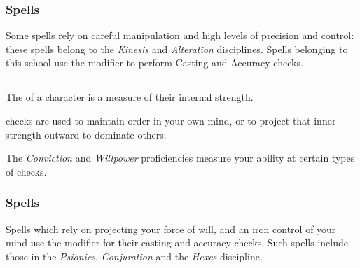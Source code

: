 \subsubsection{Spells}

Some spells rely on careful manipulation and high levels of precision and control: these spells belong to the {\it Kinesis} and {\it Alteration} disciplines. Spells belonging to this school use the \attFin{} modifier to perform Casting and Accuracy checks. 

\subsection{\attSpr{}}

The \attSpr{} of a character is a measure of their internal strength. 

\attSpr{} checks are used to maintain order in your own mind, or to project that inner strength outward to dominate others. 

The {\it Conviction} and {\it Willpower} proficiencies measure your ability at certain types of \attSpr{} checks. 



\subsubsection{Spells}

Spells which rely on projecting your force of will, and an iron control of your mind use the \attSpr{} modifier for their casting and accuracy checks. Such spells include those in the {\it Psionics}, {\it Conjuration} and the {\it Hexes} discipline.  

